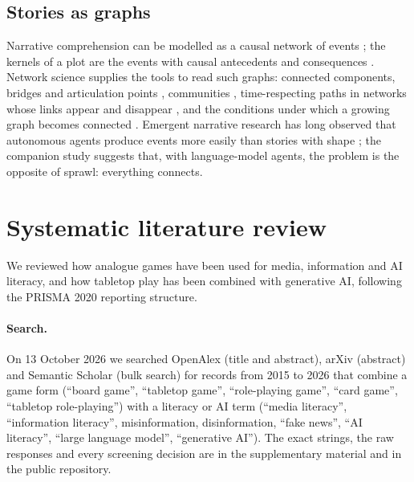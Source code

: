 \documentclass[12pt]{article}
\begin{document}
\subsection{Stories as graphs}

Narrative comprehension can be modelled as a causal network of events
\parencite{trabasso1985}; the kernels of a plot are the events with causal
antecedents and consequences \parencite{barthes1975,chatman1978}. Network
science supplies the tools to read such graphs: connected components,
bridges and articulation points \parencite{tarjan1972}, communities
\parencite{blondel2008}, time-respecting paths in networks whose links
appear and disappear \parencite{holme2012}, and the conditions under which a
growing graph becomes connected \parencite{newman2018}. Emergent narrative
research has long observed that autonomous agents produce events more
easily than stories with shape \parencite{aylett1999,louchart2004,riedl2013};
the companion study suggests that, with language-model agents, the problem
is the opposite of sprawl: everything connects.

\section{Systematic literature review}

We reviewed how analogue games have been used for media, information and AI
literacy, and how tabletop play has been combined with generative AI,
following the PRISMA 2020 reporting structure.

\paragraph{Search.} On 13 October 2026 we searched OpenAlex (title and
abstract), arXiv (abstract) and Semantic Scholar (bulk search) for records
from 2015 to 2026 that combine a game form (\enquote{board game},
\enquote{tabletop game}, \enquote{role-playing game}, \enquote{card game},
\enquote{tabletop role-playing}) with a literacy or AI term (\enquote{media
literacy}, \enquote{information literacy}, misinformation, disinformation,
\enquote{fake news}, \enquote{AI literacy}, \enquote{large language model},
\enquote{generative AI}). The exact strings, the raw responses and every
screening decision are in the supplementary material and in the public
repository.
\end{document}
